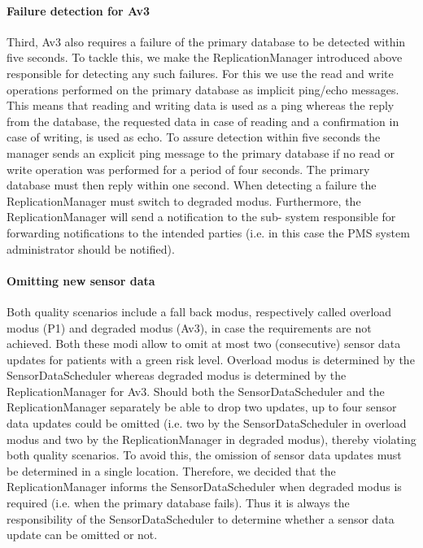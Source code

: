 \documentclass[a4paper,10pt]{article}
\begin{document}
\paragraph{Failure detection for Av3}
Third, Av3 also requires a failure of the primary database to be detected within five seconds. To tackle this, we make the ReplicationManager introduced above responsible for detecting any such failures. For this we use the read and write operations performed on the primary database as implicit ping/echo messages. This means that reading and writing data is used as a ping whereas the reply from the database, the requested data in case of reading and a confirmation in case of writing, is used as echo. To assure detection within five seconds the manager sends an explicit ping message to the primary database if no read or write operation was performed for a period of four seconds. The primary database must then reply within one second. When detecting a failure the ReplicationManager must switch to degraded modus. Furthermore, the ReplicationManager will send a notification to the sub- system responsible for forwarding notifications to the intended parties (i.e. in this case the PMS system administrator should be notified).

\paragraph{Omitting new sensor data}
Both quality scenarios include a fall back modus, respectively called overload modus (P1) and degraded modus (Av3), in case the requirements are not achieved. Both these modi allow to omit at most two (consecutive) sensor data updates for patients with a green risk level. Overload modus is determined by the SensorDataScheduler whereas degraded modus is determined by the ReplicationManager for Av3. Should both the SensorDataScheduler and the ReplicationManager separately be able to drop two updates, up to four sensor data updates could be omitted (i.e. two by the SensorDataScheduler in overload modus and two by the ReplicationManager in degraded modus), thereby violating both quality scenarios. To avoid this, the omission of sensor data updates must be determined in a single location. Therefore, we decided that the ReplicationManager informs the SensorDataScheduler when degraded modus is required (i.e. when the primary database fails). Thus it is always the responsibility of the SensorDataScheduler to determine whether a sensor data update can be omitted or not.
\end{document}
